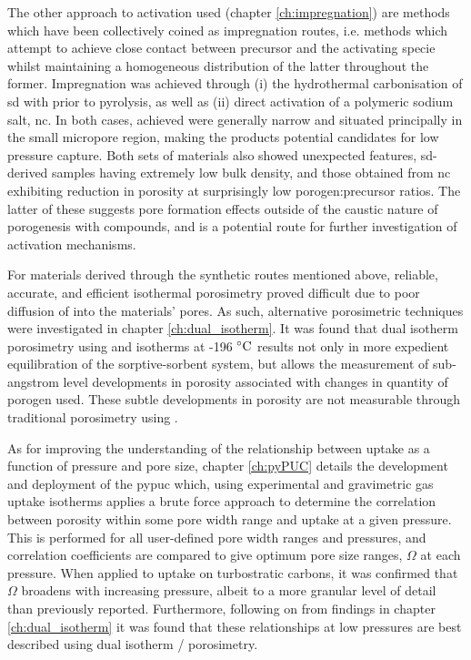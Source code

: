 The other approach to activation used (chapter \ref{ch:impregnation}) are methods which have been collectively coined as impregnation routes, i.e. methods which attempt to achieve close contact between precursor and the activating specie whilst maintaining a homogeneous distribution of the latter throughout the former. Impregnation was achieved through (i) the hydrothermal carbonisation of \acrfull{sd} with  prior to pyrolysis, as well as (ii) direct activation of a polymeric sodium salt, \acrfull{nc}. In both cases,  achieved were generally narrow and situated principally in the small \gls{micropore} region, making the products potential candidates for low pressure  capture. Both sets of materials also showed unexpected features, \acrshort{sd}-derived samples having extremely low bulk density, and those obtained from \acrshort{nc} exhibiting reduction in porosity at surprisingly low \gls{porogen}:precursor ratios. The latter of these suggests pore formation effects outside of the caustic nature of \gls{porogenesis} with  compounds, and is a potential route for further investigation of \gls{activation} mechanisms.

For materials derived through the synthetic routes mentioned above, reliable, accurate, and efficient isothermal porosimetry proved difficult due to poor diffusion of  into the materials' pores. As such, alternative porosimetric techniques were investigated in chapter \ref{ch:dual_isotherm}. It was found that dual isotherm porosimetry using  and  isotherms at -196 $\rm ^{\circ}C$ results not only in more expedient equilibration of the sorptive-sorbent system, but allows the measurement of sub-angstrom level developments in porosity associated with changes in quantity of \gls{porogen} used. These subtle developments in porosity are not measurable through traditional porosimetry using . 

As for improving the understanding of the relationship between  uptake as a function of pressure and pore size, chapter \ref{ch:pyPUC} details the development and deployment of the \acrfull{pypuc} which, using experimental  and gravimetric gas uptake isotherms applies a brute force approach to determine the correlation between porosity within some pore width range and  uptake at a given pressure. This is performed for all user-defined pore width ranges and pressures, and correlation coefficients are compared to give optimum pore size ranges, $\Omega$ at each pressure. When applied to  uptake on \glspl{turbostratic carbon}, it was confirmed that $\Omega$ broadens with increasing pressure, albeit to a more granular level of detail than previously reported. Furthermore, following on from findings in chapter \ref{ch:dual_isotherm} it was found that these relationships at low pressures are best described using dual isotherm / porosimetry.